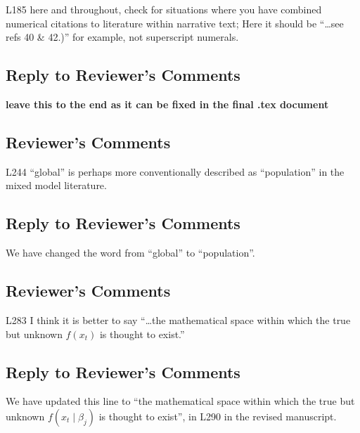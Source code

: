 \documentclass[
]{article}
\begin{document}
L185 here and throughout, check for situations where you have combined numerical citations to literature within narrative text; Here it should be ``\ldots see refs 40 \& 42.)'' for example, not superscript numerals.

\hypertarget{section-20}{%
\subsection{\texorpdfstring{\textcolor{reviewersblue} {Reply to Reviewer's Comments}}{}}\label{section-20}}

\textbf{leave this to the end as it can be fixed in the final .tex document}

\hypertarget{reviewers-comments-20}{%
\subsection{Reviewer's Comments}\label{reviewers-comments-20}}

L244 ``global'' is perhaps more conventionally described as ``population'' in the mixed model literature.

\hypertarget{section-21}{%
\subsection{\texorpdfstring{\textcolor{reviewersblue} {Reply to Reviewer's Comments}}{}}\label{section-21}}

We have changed the word from ``global'' to ``population''.

\hypertarget{reviewers-comments-21}{%
\subsection{Reviewer's Comments}\label{reviewers-comments-21}}

L283 I think it is better to say ``\ldots the mathematical space within which the true but unknown \(f(x_t)\) is thought to exist.''

\hypertarget{section-22}{%
\subsection{\texorpdfstring{\textcolor{reviewersblue} {Reply to Reviewer's Comments}}{}}\label{section-22}}

We have updated this line to ``the mathematical space within which the true but unknown \(f(x_t\mid \beta_j)\) is thought to exist'', in L290 in the revised manuscript.
\end{document}
